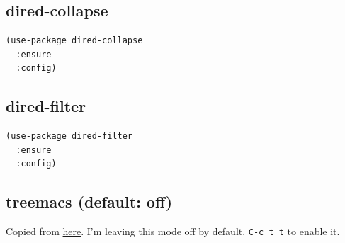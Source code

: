 \documentclass[11pt]{article}
\begin{document}
\subsection{dired-collapse}
\label{sec:org367d67e}
\begin{verbatim}
(use-package dired-collapse
  :ensure
  :config)
\end{verbatim}
\subsection{dired-filter}
\label{sec:orgc9902b4}
\begin{verbatim}
(use-package dired-filter
  :ensure
  :config)
\end{verbatim}
\subsection{treemacs (default: off)}
\label{sec:org090dfeb}
Copied from \href{https://github.com/Alexander-Miller/treemacs\#installation}{here}. I'm leaving this mode off by default. \texttt{C-c t t} to
enable it.
\end{document}
